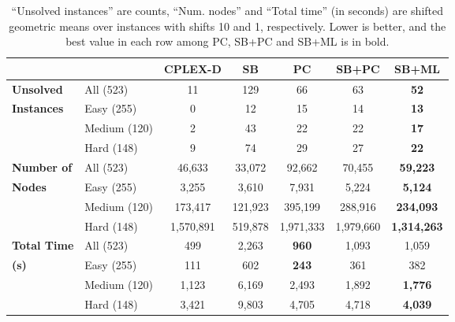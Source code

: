 \begin{table*}[htb!]
    \centering
    \begin{tabular}{|l l c c| c c c|}
        \hline
        \textbf{} & {} & \textbf{CPLEX-D} & \textbf{SB} & \textbf{PC} & \textbf{SB+PC} & \textbf{SB+ML}\\
        \hline
        \quad \textbf{Unsolved} & All (523) & 11 & 129 & 66 & 63 & \textbf{52} \\
        \quad \textbf{Instances} & Easy (255) & 0 & 12 & 15 & 14 & \textbf{13} \\
        \quad & Medium (120) & 2 & 43 & 22 & 22 & \textbf{17} \\
        \quad & Hard (148) & 9 & 74 & 29 & 27 & \textbf{22} \\
        \hline
        \quad \textbf{Number of} & All (523) & 46,633 & 33,072 & 92,662 & 70,455 & \textbf{59,223} \\
        \quad \textbf{Nodes} & Easy (255) & 3,255 & 3,610 & 7,931 & 5,224 & \textbf{5,124} \\
        \quad & Medium (120) & 173,417 & 121,923 & 395,199 & 288,916 & \textbf{234,093} \\
        \quad & Hard (148) & 1,570,891 & 519,878 & 1,971,333 & 1,979,660 & \textbf{1,314,263} \\
        \hline
        \quad \textbf{Total Time} & All (523) & 499 & 2,263 & \textbf{960} & 1,093 & 1,059 \\
        \quad \textbf{(s)} & Easy (255) & 111 & 602 & \textbf{243} & 361 & 382 \\
        \quad & Medium (120) & 1,123 & 6,169 & 2,493 & 1,892 & \textbf{1,776} \\
        \quad & Hard (148) & 3,421 & 9,803 & 4,705 & 4,718 & \textbf{4,039} \\
        \hline
    \end{tabular}
    \caption{“Unsolved instances” are counts, “Num. nodes” and “Total time” (in seconds) are shifted geometric means over instances with shifts 10 and 1, respectively.
    Lower is better, and the best value in each row among PC, SB+PC and SB+ML is in bold.}
    \label{tab:khalil-results}
\end{table*}